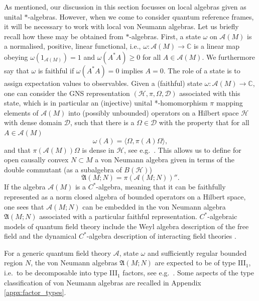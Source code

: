 \documentclass[sn-mathphys-num]{sn-jnl}%
\newcommand{\CC}{\mathbb{C}}
\newcommand{\HH}{\mathcal{H}}
\newcommand{\Af}{\mathscr{A}}
\numberwithin{equation}{section}
\theoremstyle{thmstyleone}%
\theoremstyle{thmstyletwo}%
\theoremstyle{thmstylethree}%
\begin{document}
As mentioned, our discussion in this section focusses on local algebras given as unital $*$-algebras. However, when we come to consider quantum reference frames, it will be necessary to work with local von Neumann algebras. Let us briefly recall how these may be obtained from $*$-algebras. 
First, a state $\omega$ on $\Af(M)$ is a normalised, positive, linear functional, i.e., $\omega:\Af(M)\to\CC$ is a linear map obeying $\omega(1_{\Af(M)})=1$ and $\omega(A^*A)\ge 0$ for all $A\in\Af(M)$. We furthermore say that $\omega$ is faithful if $\omega(A^*A)=0$ implies $A=0$. The role of a state is to assign expectation values to observables.  
 Given a (faithful) state $\omega:\Af(M)\to \CC$, one can consider the GNS representation $(\HH,\pi,\Omega,\mathscr{D})$ associated with this state, which is in particular an (injective) unital *-homomorphism $\pi$ mapping elements of $\Af(M)$ into (possibly unbounded) operators on a Hilbert space $\HH$ with dense domain $\mathscr{D}$, such that there is a $\Omega\in \mathscr{D}$ with the property that for all $A\in \Af(M)$ 
\begin{equation}
    \omega(A)=\langle \Omega,\pi(A)\Omega\rangle,
\end{equation}
and that $\pi(\Af(M))\Omega$ is dense in $\HH$, see e.g.\ \cite[Ch.~5]{AdvAQFT}. This allows us to define for open causally convex $N\subset M$ a von Neumann algebra given in terms of the double commutant (as a subalgebra of $B(\HH)$)
\begin{equation}
    \mathfrak{A}(M;N)=\pi(\Af(M;N))''.
\end{equation}
If the algebra $\Af(M)$ is a $C^*$-algebra, meaning that it can be faithfully represented as a norm closed algebra of bounded operators on a Hilbert space, one sees that $\Af(M;N)$ can be embedded in the von Neumann algebra $\mathfrak{A}(M;N)$ associated with a particular faithful representation. $C^*$-algebraic models of quantum field theory include the Weyl algebra description of the free field and the dynamical $C^*$-algebra description of interacting field theories \cite{Buchholz_2020}.

For a generic quantum field theory $\Af$, state $\omega$ and sufficiently regular bounded region $N$, the von Neumann algebras $\mathfrak{A}(M;N)$ are expected to be of type III${}_1$, i.e.\ to be decomposable into type III${}_1$ factors, see e.g.\ \cite{fredenhagen1985modular,Buchholz1987Universal,Verch:1996wv,YNGVASON2005135}.  Some aspects 
 of the type classification of von Neumann algebras are recalled in Appendix \ref{appx:factor_types}. 
\end{document}
